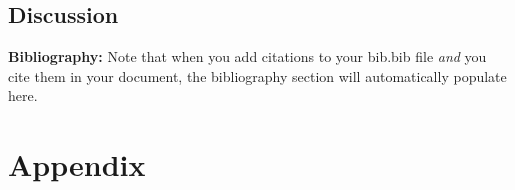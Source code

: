 \documentclass{article}\usepackage[]{graphicx}\usepackage[]{xcolor}
\begin{document}
\begin{multicols}{2}
\section{Discussion}


\vspace{2em}

\noindent\textbf{Bibliography:} Note that when you add citations to your bib.bib file \emph{and}
you cite them in your document, the bibliography section will automatically populate here.

\begin{tiny}

\end{tiny}
\end{multicols}

\newpage
\onecolumn
\section{Appendix}
\end{document}
